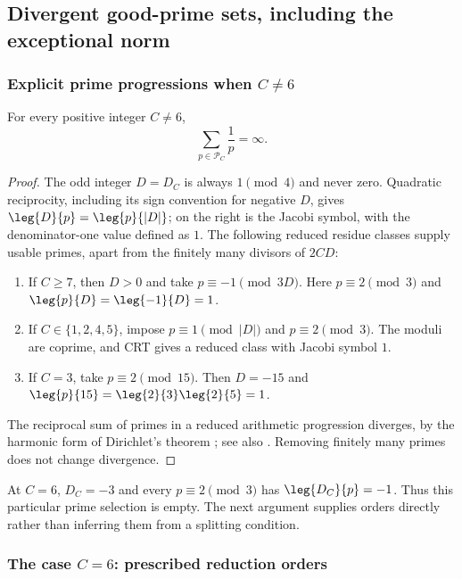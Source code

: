\documentclass[11pt,a4paper]{article}
\theoremstyle{definition}\newtheorem{definition}[theorem]{Definition}
\theoremstyle{remark}\newtheorem{remark}[theorem]{Remark}
\begin{document}
\subsection{Divergent good-prime sets, including the exceptional norm}

\subsubsection{Explicit prime progressions when \texorpdfstring{$C\ne6$}{C is not 6}}

\begin{proposition}\label{R08:prop:primes}
For every positive integer $C\ne6$,
\[
                             \sum_{p\in\mathcal P_C}\frac1p=\infty.
\]
\end{proposition}
\begin{proof}
The odd integer $D=D_C$ is always $1\pmod4$ and never zero.
Quadratic reciprocity, including its sign convention for negative $D$,
gives $\leg{D}{p}=\leg{p}{|D|}$; on the right is the Jacobi symbol,
with the denominator-one value defined as $1$.
The following reduced residue classes supply usable primes, apart
from the finitely many divisors of $2CD$:
\begin{enumerate}[label=\textup{(\roman*)}]
\item If $C\ge7$, then $D>0$ and take $p\equiv-1\pmod{3D}$.
Here $p\equiv2\pmod3$ and $\leg{p}{D}=\leg{-1}{D}=1$.
\item If $C\in\{1,2,4,5\}$, impose $p\equiv1\pmod{|D|}$
and $p\equiv2\pmod3$. The moduli are coprime, and CRT gives a
reduced class with Jacobi symbol $1$.
\item If $C=3$, take $p\equiv2\pmod{15}$. Then $D=-15$ and
$\leg{p}{15}=\leg{2}{3}\leg{2}{5}=1$.
\end{enumerate}
The reciprocal sum of primes in a reduced arithmetic progression
diverges, by the harmonic form of Dirichlet's theorem
\cite[Theorem~4.11 and its proof]{Kedlaya}; see also
\cite[Equation~27.11.9]{R08-DLMF}. Removing finitely many primes does not
change divergence.
\end{proof}

At $C=6$, $D_C=-3$ and every $p\equiv2\pmod3$ has
$\leg{D_C}{p}=-1$. Thus this particular prime selection is empty.
The next argument supplies orders directly rather than inferring
them from a splitting condition.

\subsubsection{The case \texorpdfstring{$C=6$}{C=6}: prescribed reduction orders}
\end{document}
